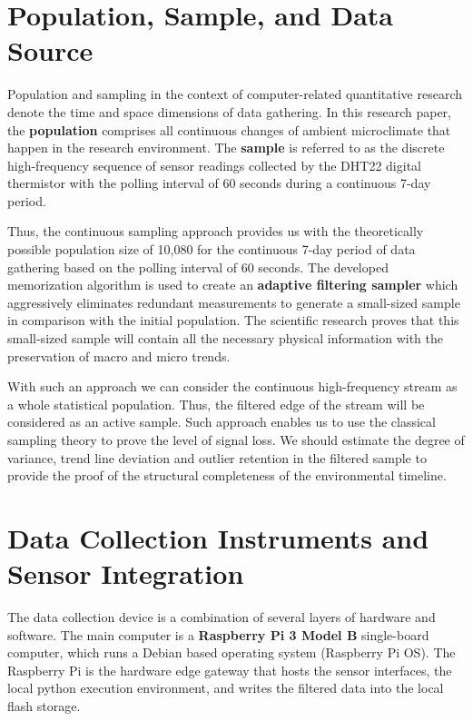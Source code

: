 \section{Population, Sample, and Data Source}
\label{sec:population}
Population and sampling in the context of computer-related quantitative research denote the time and space dimensions of data gathering. In this research paper, the \textbf{population} comprises all continuous changes of ambient microclimate that happen in the research environment. The \textbf{sample} is referred to as the discrete high-frequency sequence of sensor readings collected by the DHT22 digital thermistor with the polling interval of 60 seconds during a continuous 7-day period.

Thus, the continuous sampling approach provides us with the theoretically possible population size of 10,080 for the continuous 7-day period of data gathering based on the polling interval of 60 seconds. The developed memorization algorithm is used to create an \textbf{adaptive filtering sampler} which aggressively eliminates redundant measurements to generate a small-sized sample in comparison with the initial population. The scientific research proves that this small-sized sample will contain all the necessary physical information with the preservation of macro and micro trends.

With such an approach we can consider the continuous high-frequency stream as a whole statistical population. Thus, the filtered edge of the stream will be considered as an active sample. Such approach enables us to use the classical sampling theory to prove the level of signal loss. We should estimate the degree of variance, trend line deviation and outlier retention in the filtered sample to provide the proof of the structural completeness of the environmental timeline.

\section{Data Collection Instruments and Sensor Integration}
\label{sec:instruments}
The data collection device is a combination of several layers of hardware and software. The main computer is a \textbf{Raspberry Pi 3 Model B} single-board computer, which runs a Debian based operating system (Raspberry Pi OS). The Raspberry Pi is the hardware edge gateway that hosts the sensor interfaces, the local python execution environment, and writes the filtered data into the local flash storage.

